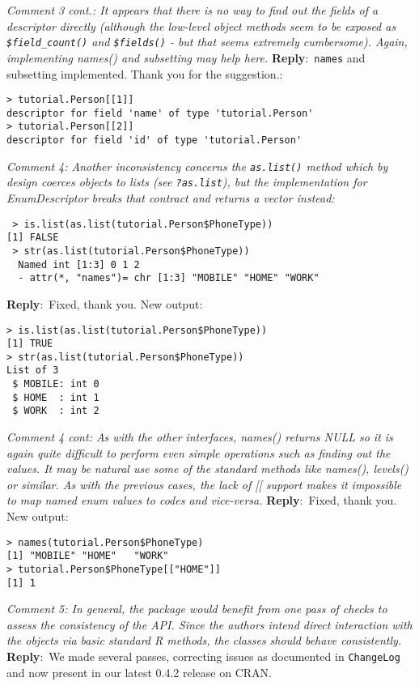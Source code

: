 \documentclass[10pt]{article}
\newcommand{\pointRaised}[2]{\smallskip %
  \textsl{{\fontseries{b}\selectfont #1}: #2}\newline}
\newcommand{\reply}[1]{\textbf{Reply}:\ #1 \smallskip } %
\begin{document}
\pointRaised{Comment 3 cont.}{It appears that there is no way to find out the fields of a descriptor 
  directly (although the low-level object methods seem to be exposed as 
  \texttt{\$field\_count()} and \texttt{\$fields()} - but that seems extremely cumbersome). 
  Again, implementing names() and subsetting may help here.}
\reply{\texttt{names} and subsetting implemented.  Thank you for the
  suggestion.:}
\begin{verbatim}
> tutorial.Person[[1]]
descriptor for field 'name' of type 'tutorial.Person' 
> tutorial.Person[[2]]
descriptor for field 'id' of type 'tutorial.Person' 
\end{verbatim}

\pointRaised{Comment 4}{Another inconsistency concerns the \texttt{as.list()} method which by design 
  coerces objects to lists (see \texttt{?as.list}), but the implementation for 
  EnumDescriptor breaks that contract and returns a vector instead:}

\begin{verbatim}
 > is.list(as.list(tutorial.Person$PhoneType))
[1] FALSE
 > str(as.list(tutorial.Person$PhoneType))
  Named int [1:3] 0 1 2
  - attr(*, "names")= chr [1:3] "MOBILE" "HOME" "WORK"
\end{verbatim}

\reply{Fixed, thank you. New output:}
\begin{verbatim}
> is.list(as.list(tutorial.Person$PhoneType))
[1] TRUE
> str(as.list(tutorial.Person$PhoneType))
List of 3
 $ MOBILE: int 0
 $ HOME  : int 1
 $ WORK  : int 2
\end{verbatim}

\pointRaised{Comment 4 cont}{As with the other interfaces, names() returns NULL so it is again quite
  difficult to perform even simple operations such as finding out the 
  values. It may be natural use some of the standard methods like names(), 
  levels() or similar. As with the previous cases, the lack of [[ support
  makes it impossible to map named enum values to codes and vice-versa.}
\reply{Fixed, thank you.  New output:}
\begin{verbatim}
> names(tutorial.Person$PhoneType)
[1] "MOBILE" "HOME"   "WORK"  
> tutorial.Person$PhoneType[["HOME"]]
[1] 1
\end{verbatim}

\pointRaised{Comment 5}{In general, the package would benefit from one pass of checks to assess
  the consistency of the API. Since the authors intend direct interaction
  with the objects via basic standard R methods, the classes should behave 
  consistently.}
\reply{We made several passes, correcting issues as documented in
  \texttt{ChangeLog} and now present in our latest 0.4.2 release on CRAN.}
\end{document}
